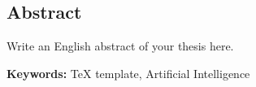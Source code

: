 \pagestyle{plain}


\begin{latin}
	
\section*{Abstract}
Write an English abstract of your thesis here.
	
\vspace{2cm}
\noindent \textbf{Keywords:}
TeX template, Artificial Intelligence
	
\end{latin}